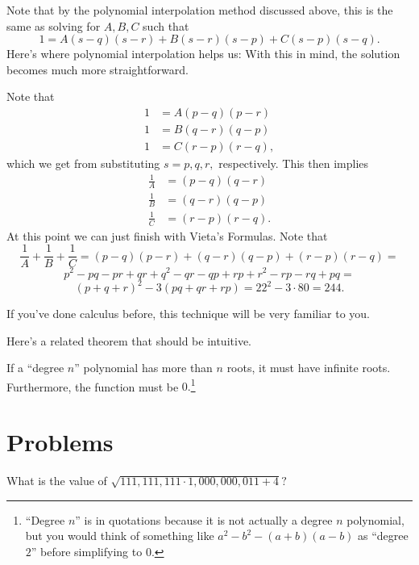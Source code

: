 \documentclass{article}
\begin{document}
\begin{sol}
Note that by the polynomial interpolation method discussed above, this is the same as solving for $A,B,C$ such that
\[1=A(s-q)(s-r)+B(s-r)(s-p)+C(s-p)(s-q).\]
Here's where polynomial interpolation helps us:  With this in mind, the solution becomes much more straightforward.

Note that
\begin{align*}
1&=A(p-q)(p-r) \\
1&=B(q-r)(q-p) \\
1&=C(r-p)(r-q),
\end{align*}
which we get from substituting $s=p,q,r,$ respectively. This then implies
\begin{align*}
\frac{1}{A}&=(p-q)(q-r) \\
\frac{1}{B}&=(q-r)(q-p) \\
\frac{1}{C}&=(r-p)(r-q).
\end{align*}
At this point we can just finish with Vieta's Formulas. Note that
\[\frac{1}{A}+\frac{1}{B}+\frac{1}{C}=(p-q)(p-r)+(q-r)(q-p)+(r-p)(r-q)=\]
\[p^2-pq-pr+qr+q^2-qr-qp+rp+r^2-rp-rq+pq=\]
\[(p+q+r)^2-3(pq+qr+rp)=22^2-3\cdot 80=244.\]
\end{sol}

If you've done calculus before, this technique will be very familiar to you.

Here's a related theorem that should be intuitive.

\begin{fact}
If a ``degree $n$'' polynomial has more than $n$ roots, it must have infinite roots. Furthermore, the function must be $0.$\footnote{``Degree $n$'' is in quotations because it is not actually a degree $n$ polynomial, but you would think of something like $a^2-b^2-(a+b)(a-b)$ as ``degree $2$'' before simplifying to $0.$}
\end{fact}

\pagebreak

\section{Problems}



\begin{prob}[MATHCOUNTS 2020]{1}
What is the value of $\sqrt{111,111,111\cdot 1,000,000,011+4}?$
\end{prob}
\end{document}
